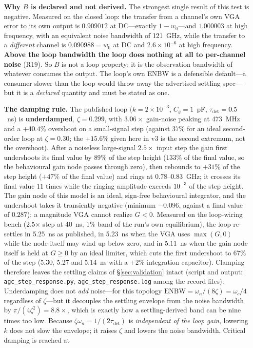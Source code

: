 \documentclass[11pt]{article}
\begin{document}
\textbf{Why $B$ is declared and not derived.} The strongest single result of this test is negative. Measured on the closed loop: the transfer from a channel's own VGA error to its own output is $0.909012$ at DC---exactly $1-w_0$---and $1.000003$ at high frequency, with an equivalent noise bandwidth of 121~GHz, while the transfer to a \textit{different} channel is $0.090988 = w_0$ at DC and $2.6\times10^{-6}$ at high frequency. \textbf{Above the loop bandwidth the loop does nothing at all to per-channel noise} (R19). So $B$ is not a loop property; it is the observation bandwidth of whatever consumes the output. The loop's own ENBW is a defensible default---a consumer slower than the loop would throw away the advertised settling spec---but it is a \textit{declared} quantity and must be stated as one.

\textbf{The damping rule.} The published loop ($k = 2\times10^{-3}$, $C_g = 1$~pF, $\tau_{\mathrm{det}} = 0.5$~ns) is \textbf{underdamped}, $\zeta = 0.299$, with $3.06\times$ gain-noise peaking at 473~MHz and a $+40.4\%$ overshoot on a small-signal step (against $37\%$ for an ideal second-order loop at $\zeta = 0.30$; the $+15.6\%$ given here in v3 is the second extremum, not the overshoot). After a noiseless large-signal $2.5\times$ input step the gain first undershoots its final value by $89\%$ of the step height ($133\%$ of the final value, so the behavioural gain node passes through zero), then rebounds to $+31\%$ of the step height ($+47\%$ of the final value) and rings at $0.78$--$0.83$~GHz; it crosses its final value 11 times while the ringing amplitude exceeds $10^{-3}$ of the step height. The gain node of this model is an ideal, sign-free behavioural integrator, and the undershoot takes it transiently negative (minimum $-0.096$, against a final value of $0.287$); a magnitude VGA cannot realize $G<0$. Measured on the loop-wiring bench (2.5$\times$ step at 40~ns, 1\% band of the run's own equilibrium), the loop re-settles in 5.25~ns as published, in 5.23~ns when the VGA uses $\max(G,0)$ while the node itself may wind up below zero, and in 5.11~ns when the gain node itself is held at $G\ge0$ by an ideal limiter, which cuts the first undershoot to $67\%$ of the step (5.30, 5.27 and 5.14~ns with a $+2\%$ integration capacitor). Clamping therefore leaves the settling claims of \S\ref{sec:validation} intact (script and output: \texttt{agc\_step\_response.py}, \texttt{agc\_step\_response.log} among the record files). Underdamping does not \textit{add} noise---for this topology $\mathrm{ENBW} = \omega_n/(8\zeta) = \omega_c/4$ regardless of $\zeta$---but it decouples the settling envelope from the noise bandwidth by $\pi/(4\zeta^2) = 8.8\times$, which is exactly how a settling-derived band can be nine times too low. Because $\zeta\omega_n = 1/(2\tau_{\mathrm{det}})$ is \textit{independent of the loop gain}, lowering $k$ does not slow the envelope; it raises $\zeta$ and lowers the noise bandwidth. Critical damping is reached at
\end{document}

